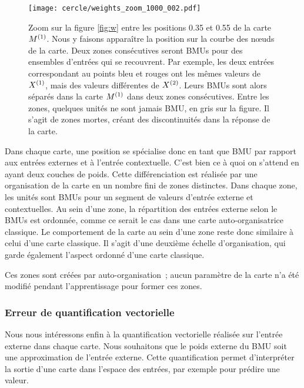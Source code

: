 \documentclass[../main]{subfiles}
\begin{document}
\begin{figure}[h!]
	\centering\texttt{[image: cercle/weights\_zoom\_1000\_002.pdf]}
   \caption{Zoom sur la figure \ref{fig:w} entre les positions 0.35 et 0.55 de la carte $M^{({1})}$. 
   Nous y faisons apparaître la position sur la courbe des n\oe{}uds de la carte.
   Deux zones consécutives seront BMUs pour des ensembles d'entrées qui se recouvrent. Par exemple, les deux entrées correspondant au points bleu et rouges ont les mêmes valeurs de $X^{({1})}$, mais des valeurs différentes de $X^{({2})}$. Leurs BMUs sont alors séparés dans la carte $M^{({1})}$ dans deux zones consécutives.
   Entre les zones, quelques unités ne sont jamais BMU, en gris sur la figure. Il s'agit de zones mortes, créant des discontinuités dans la réponse de la carte.
   \label{fig:w_zoom}}
\end{figure}


Dans chaque carte, une position se spécialise donc en tant que BMU par rapport aux entrées externes et à l'entrée contextuelle. C'est bien ce à quoi on s'attend en ayant deux couches de poids. 
Cette différenciation est réalisée par une organisation de la carte en un nombre fini de zones distinctes. Dans chaque zone, les unités sont BMUs pour un segment de valeurs d'entrée externe et contextuelles. Au sein d'une zone, la répartition des entrées externe selon le BMUs est ordonnée, comme ce serait le cas dans une carte auto-organisatrice classique. Le comportement de la carte au sein d'une zone reste donc similaire à celui d'une carte classique.
Il s'agit d'une deuxième échelle d'organisation, qui garde également l'aspect ordonné d'une carte classique. 

Ces zones sont créées par auto-organisation~; aucun paramètre de la carte n'a été modifié pendant l'apprentissage pour former ces zones.

\subsubsection{Erreur de quantification vectorielle}

Nous nous intéressons enfin à la quantification vectorielle réalisée sur l'entrée externe dans chaque carte. Nous souhaitons que le poids externe du BMU soit une approximation de l'entrée externe. Cette quantification permet d'interpréter la sortie d'une carte dans l'espace des entrées, par exemple pour prédire une valeur.
\end{document}
